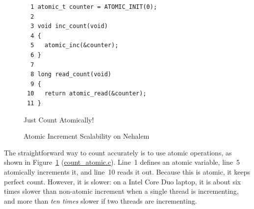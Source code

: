 \begin{figure}[tbp]
{ \scriptsize
\begin{verbatim}
  1 atomic_t counter = ATOMIC_INIT(0);
  2 
  3 void inc_count(void)
  4 {
  5   atomic_inc(&counter);
  6 }
  7 
  8 long read_count(void)
  9 {
 10   return atomic_read(&counter);
 11 }
\end{verbatim}
}
\caption{Just Count Atomically!}
\label{fig:count:Just Count Atomically!}
\end{figure}

\begin{figure}[tb]
\begin{center}
\end{center}
\caption{Atomic Increment Scalability on Nehalem}
\label{fig:count:Atomic Increment Scalability on Nehalem}
\end{figure}

The straightforward way to count accurately is to use atomic operations,
as shown in
Figure~\ref{fig:count:Just Count Atomically!} (\url{count_atomic.c}).
Line~1 defines an atomic variable, line~5 atomically increments it, and
line~10 reads it out.
Because this is atomic, it keeps perfect count.
However, it is slower: on a Intel Core Duo laptop, it is about
six times slower than non-atomic increment
when a single thread is incrementing, and more than \emph{ten times}
slower if two threads are incrementing.

